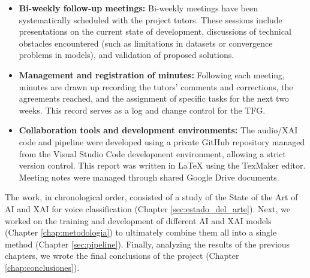 \begin{itemize} 
	\item \textbf{Bi-weekly follow-up meetings:} Bi-weekly meetings have been systematically scheduled with the project tutors. These sessions include presentations on the current state of development, discussions of technical obstacles encountered (such as limitations in datasets or convergence problems in models), and validation of proposed solutions.
    
    \item \textbf{Management and registration of minutes:} Following each meeting, minutes are drawn up recording the tutors' comments and corrections, the agreements reached, and the assignment of specific tasks for the next two weeks. This record serves as a log and change control for the TFG.
    
    \item \textbf{Collaboration tools and development environments:} The audio/XAI code and pipeline were developed using a private GitHub repository managed from the Visual Studio Code development environment, allowing a strict version control. This report was written in LaTeX using the TexMaker editor. Meeting notes were managed through shared Google Drive documents.
\end{itemize}

The work, in chronological order, consisted of a study of the State of the Art of AI and XAI for voice classification (Chapter \ref{sec:estado_del_arte}). Next, we worked on the training and development of different AI and XAI models (Chapter \ref{chap:metodologia}) to ultimately combine them all into a single method (Chapter \ref{sec:pipeline}). Finally, analyzing the results of the previous chapters, we wrote the final conclusions of the project (Chapter \ref{chap:conclusiones}).